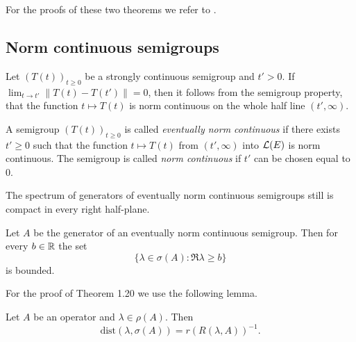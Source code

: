 For the proofs of these two theorems we refer to \citet[Chapter 3, Theorem 4.7 and 4.8]{pazy:1983}.

\subsection{Norm continuous semigroups} \label{subsec:a2-1.se6}
Let $(T(t))_{t\geq 0}$ be a strongly continuous semigroup and $t' > 0$.
If $\lim_{t \to t'} \|T(t) - T(t')\| = 0$, then it follows from the semigroup property, that the function $t \mapsto T(t)$ is norm continuous on the whole half line $(t',\infty)$.

\begin{definition}\label{def:a2-1.19}
A semigroup $(T(t))_{t\geq 0}$ is called \emph{eventually norm continuous} if there exists $t' \geq 0$ such that the function $t \mapsto T(t)$ from $(t',\infty)$ into $\mathcal{L}(E)$ is norm continuous.
The semigroup is called \emph{norm continuous} if $t'$ can be chosen equal to $0$.
\end{definition}

The spectrum of generators of eventually norm continuous semigroups still is compact in every right half-plane.

\begin{theorem}\label{thm:a2-1.20}
Let $A$ be the generator of an eventually norm continuous semigroup.
Then for every $b \in \mathbb{R}$ the set
\[
    \{\lambda \in \sigma(A) \colon \Re\lambda \geq b\}
\]
is bounded.
\end{theorem}
For the proof of Theorem 1.20 we use the following lemma.
\begin{lemma}\label{lem:a2-1.21}
Let $A$ be an operator and $\lambda \in \rho(A)$.
Then
\[
    \text{dist}(\lambda,\sigma(A)) = r(R(\lambda,A))^{-1}.
\]
\end{lemma}


